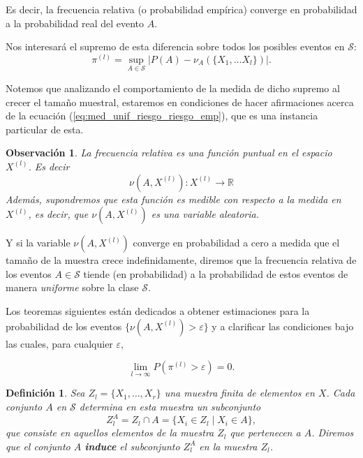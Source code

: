 \documentclass{report}
\newtheorem{dfn}{Definición}[subsection]
\newtheorem{obs}{Observación}[subsection]
\begin{document}
Es decir, la frecuencia relativa (o probabilidad empírica) converge en probabilidad a la probabilidad real del evento $A$.\newline

Nos interesará el supremo de esta diferencia sobre todos los posibles eventos en $\mathcal{S}$:
\begin{equation}
    \pi^{(l)} = \sup_{A\in\mathcal{S}} |P(A)-\nu_A(\{X_1,\dots X_l\})|. \label{def: funcion pi}
\end{equation}

Notemos que analizando el comportamiento de la medida de dicho supremo al crecer el tamaño muestral, 
estaremos en condiciones de hacer afirmaciones acerca de la ecuación (\ref{eq:med_unif_riesgo_riesgo_emp}),
que es una instancia particular de esta.\newline

\begin{obs}
La frecuencia relativa es una función puntual en el espacio \( X^{(l)} \). Es decir
\[ \nu(A, X^{(l)}): X^{(l)} \rightarrow \mathbb{R}
\]
Además, supondremos que esta función es medible con respecto a la medida en \( X^{(l)} \), 
es decir, que \( \nu(A, X^{(l)}) \) es una variable aleatoria.
\end{obs} 

Y si la variable \( \nu(A, X^{(l)}) \) converge en probabilidad a cero a medida que 
el tamaño de la muestra crece indefinidamente, diremos que la frecuencia relativa 
de los eventos \( A \in \mathcal{S} \) tiende (en probabilidad) a la probabilidad 
de estos eventos de manera \textit{uniforme} sobre la clase \( \mathcal{S} \).\newline

Los teoremas siguientes están dedicados a obtener estimaciones para la probabilidad 
de los eventos \( \{ \nu(A, X^{(l)}) > \varepsilon \} \) y a clarificar las condiciones 
bajo las cuales, para cualquier \( \varepsilon \),

\[
\lim_{l \to \infty} P\left(\pi^{(l)} > \varepsilon\right) = 0.
\]
\bigskip


\begin{dfn}
Sea \( Z_l = \{X_1, \dots, X_r\} \) una muestra finita de elementos en \( X \). 
Cada conjunto \( A \) en \( \mathcal{S} \) determina en esta muestra un subconjunto 
\[ 
    Z_l^A = Z_l \cap A = \{X_i \in Z_l \mid X_i \in A\}, 
\]
que consiste en aquellos elementos de la 
muestra \( Z_l \) que pertenecen a \( A \). Diremos que el conjunto \( A \) \textbf{induce} 
el subconjunto \( Z_l^A  \) en la muestra \( Z_l \).
\end{dfn}
\bigskip
\end{document}
